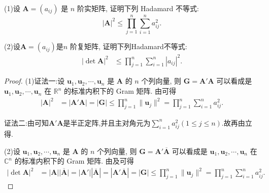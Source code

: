 \documentclass[../../main.tex]{subfiles}
\begin{document}
\begin{proposition}\label{proposition:矩阵的Hadamard不等式-例9.17}
(1)设 $\boldsymbol{A} = (a_{ij})$ 是 $n$ 阶实矩阵, 证明下列 Hadamard 不等式:
\[
|\boldsymbol{A}|^2 \leqslant  \prod_{j = 1}^{n} \sum_{i = 1}^{n} a_{ij}^2.
\]

(2)设$\boldsymbol{A} = (a_{ij})$是$n$ 阶复矩阵, 证明下列Hadamard不等式:
\begin{align*}
|\det \boldsymbol{A}|^2 &\leqslant  \prod_{j = 1}^{n} \sum_{i = 1}^{n} |a_{ij}|^2.
\end{align*} 
\end{proposition}
\begin{proof}
(1){\color{blue}证法一:}设 $\boldsymbol{u}_1,\boldsymbol{u}_2,\cdots,\boldsymbol{u}_n$ 是 $\boldsymbol{A}$ 的 $n$ 个列向量, 则 $\boldsymbol{G} = \boldsymbol{A}'\boldsymbol{A}$ 可以看成是 $\boldsymbol{u}_1,\boldsymbol{u}_2,\cdots,\boldsymbol{u}_n$ 在 $\mathbb{R}^n$ 的标准内积下的 Gram 矩阵. 由可得
\begin{align*}
|\boldsymbol{A}|^2 &= |\boldsymbol{A}'\boldsymbol{A}| = |\boldsymbol{G}| \leqslant  \prod_{j = 1}^{n} \|\boldsymbol{u}_j\|^2 = \prod_{j = 1}^{n} \sum_{i = 1}^{n} a_{ij}^2.
\end{align*} 

{\color{blue}证法二:}由可知$\boldsymbol{A}'\boldsymbol{A}$是半正定阵,并且主对角元为$\sum_{i = 1}^{n} a_{ij}^2(1\leqslant  j\leqslant  n)$.故再由立得.


(2)设 $\boldsymbol{u}_1,\boldsymbol{u}_2,\cdots,\boldsymbol{u}_n$ 是 $\boldsymbol{A}$ 的 $n$ 个列向量, 则 $\boldsymbol{G} = \boldsymbol{A}'\overline{\boldsymbol{A}}$ 可以看成是 $\boldsymbol{u}_1,\boldsymbol{u}_2,\cdots,\boldsymbol{u}_n$ 在 $\mathbb{C}^n$ 的标准内积下的 Gram 矩阵. 由及可得
\begin{align*}
|\det \boldsymbol{A}|^2 &= \left| \boldsymbol{A} \right|\overline{\left| \boldsymbol{A} \right|}=\left| \boldsymbol{A}' \right|\left| \overline{\boldsymbol{A}} \right|= |\boldsymbol{A}'\overline{\boldsymbol{A}}| = |\boldsymbol{G}| \leqslant  \prod_{j = 1}^{n} \|\boldsymbol{u}_j\|^2 = \prod_{j = 1}^{n} \sum_{i = 1}^{n} a_{ij}^2.
\end{align*} 

\end{proof}
\end{document}
